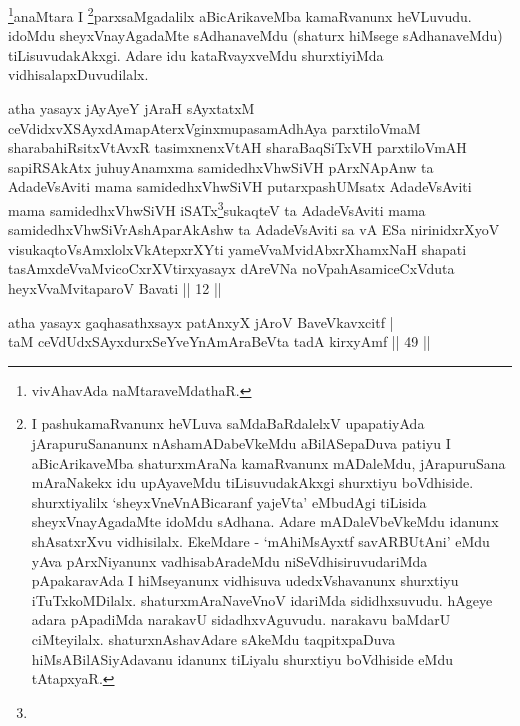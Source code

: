\begin{artha}
\footnote[1]{vivAhavAda naMtaraveMdathaR.}anaMtara I \footnote[2]{I 
pashukamaRvanunx heVLuva saMdaBaRdalelxV upapatiyAda jArapuruSananunx 
nAshamADabeVkeMdu aBilASepaDuva patiyu I aBicArikaveMba shaturxmAraNa 
kamaRvanunx mADaleMdu, jArapuruSana mAraNakekx idu upAyaveMdu 
tiLisuvudakAkxgi shurxtiyu boVdhiside. shurxtiyalilx 
`sheyxVneVnABicaranf yajeVta' eMbudAgi tiLisida sheyxVnayAgadaMte 
idoMdu sAdhana. Adare mADaleVbeVkeMdu idanunx shAsatxrXvu vidhisilalx. 
EkeMdare - `mAhiMsAyxtf savARBUtAni' eMdu yAva pArxNiyanunx 
vadhisabAradeMdu niSeVdhisiruvudariMda pApakaravAda I hiMseyanunx 
vidhisuva udedxVshavanunx shurxtiyu iTuTxkoMDilalx. 
shaturxmAraNaveVnoV idariMda sididhxsuvudu. hAgeye adara pApadiMda 
narakavU sidadhxvAguvudu. narakavu baMdarU ciMteyilalx. 
shaturxnAshavAdare sAkeMdu taqpitxpaDuva hiMsABilASiyAdavanu idanunx 
tiLiyalu shurxtiyu boVdhiside eMdu tAtapxyaR.}parxsaMgadalilx aBicArikaveMba 
kamaRvanunx heVLuvudu. idoMdu sheyxVnayAgadaMte sAdhanaveMdu (shaturx 
hiMsege sAdhanaveMdu) tiLisuvudakAkxgi. Adare idu kataRvayxveMdu 
shurxtiyiMda vidhisalapxDuvudilalx.
\end{artha}

\begin{shl}
atha yasayx jAyAyeY jAraH sAyxtatxM ceVdidxvXSAyxdAmapAterxV\s ginxmupasamAdhAya parxtiloVmaM sharabahiRsitxVtAvxR tasimxnenxVtAH sharaBaqSiTxVH parxtiloVmAH sapiRSAkAtx juhuyAnamxma samidedhxV\s hwSiVH pArxNApAnw ta AdadeV\s sAviti mama samidedhxV\s hwSiVH putarxpashUMsatx AdadeV\s sAviti mama samidedhxV\s hwSiVH \footnotemark[1]{}iSATx\footnote[2]{}sukaqteV ta AdadeV\s sAviti mama samidedhxV\s hwSiV\footnotemark[3]{}rAshA\footnotemark[4]{}parAkAshw ta AdadeV\s sAviti sa vA ESa nirinidxrXyoV visukaqtoV\s sAmxlolxVkAtepxrXYti yameVvaMvidAbxrXhamxNaH shapati tasAmxdeVvaMvicoCxrXVtirxyasayx dAreVNa noVpahAsamiceCxVduta heyxVvaMvitaparoV Bavati || 12 ||
\end{shl}


\begin{shl}
atha yasayx gaqhasathxsayx patAnxyX jAroV BaveVkavxcitf | \\
taM ceVdUdxSAyxdurxSeYveYnAmAraBeVta tadA kirxyAmf \hfill|| 49 || 
\end{shl}

